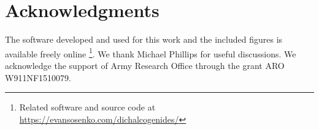 \section{Acknowledgments}

The software developed and used for this work
and the included figures is available freely online
\footnote{%
  Related software and source code at \\
  \url{https://evansosenko.com/dichalcogenides/}
}.
We thank Michael Phillips for useful discussions.
We acknowledge the support of Army Research Office through the grant
ARO W911NF1510079.
